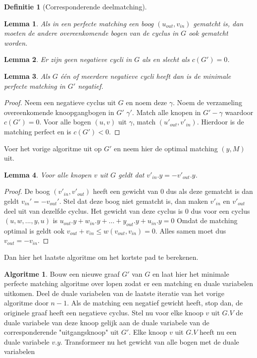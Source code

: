 \documentclass[conference]{IEEEtran}
\newtheorem{lemma}{Lemma}[section]
\theoremstyle{definition}
\newtheorem{definition}{Definitie}[section]
\newtheorem{algorithmm}{Algoritme}[section]
\begin{document}
\begin{definition}[Corresponderende deelmatching]
\end{definition}

\begin{lemma}
    Als in een perfecte matching een boog $(u_{out}, v_{in})$ gematcht is, dan moeten de andere overeenkomende bogen van de cyclus in $G$ ook gematcht worden.
\end{lemma}

\begin{lemma}
    Er zijn geen negatieve cycli in $G$ als en slecht als $c(G') = 0$.
\end{lemma}

\begin{lemma}
    Als $G$ één of meerdere negatieve cycli heeft dan is de minimale perfecte matching in $G'$ negatief.
\end{lemma}
\begin{proof}
    Neem een negatieve cyclus uit $G$ en noem deze $\gamma$. Noem de verzameling overeenkomende knoopgangbogen in $G'$ $\gamma'$. Match alle knopen in $G' - \gamma$ waardoor $c(G') = 0$. Voor alle bogen $(u, v)$ uit $\gamma$, match $(u'_{out}, v'_{in})$. Hierdoor is de matching perfect en is $c(G') < 0$.
\end{proof}

Voer het vorige algoritme uit op $G'$ en neem hier de optimal matching $(y, M)$ uit.

\begin{lemma}
    Voor alle knopen $v$ uit $G$ geldt dat $v'_{in}.y = -v'_{out}.y$.
\end{lemma}
\begin{proof}
    De boog $(v'_{in}, v'_{out})$ heeft een gewicht van $0$ dus als deze gematcht is dan geldt $v_{in}' = -v_{out}'$. Stel dat deze boog niet gematcht is, dan maken $v'_{in}$ en $v'_{out}$ deel uit van dezelfde cyclus. Het gewicht van deze cyclus is $0$ dus voor een cyclus $(u, w, ..., y, u)$ is $u_{out}.y + w_{in}.y + \dots + y_{out}.y + u_{in}.y = 0$ Omdat de matching optimal is geldt ook $v_{out} + v_{in} \leq w(v_{out}, v_{in}) = 0$. Alles samen moet dus $v_{out} = -v_{in}$.
\end{proof}

Dan hier het laatste algoritme om het kortste pad te berekenen.

\begin{algorithmm}
    Bouw een nieuwe graaf $G'$ van $G$ en laat hier het minimale perfecte matching algoritme over lopen zodat er een matching en duale variabelen uitkomen. Deel de duale variabelen van de laatste iteratie van het vorige algoritme door $n - 1$. Als de matching een negatief gewicht heeft, stop dan, de originele graaf heeft een negatieve cyclus. Stel nu voor elke knoop $v$ uit $G.V$ de duale variabele van deze knoop gelijk aan de duale variabele van de corresponderende "uitgangsknoop" uit $G'$. Elke knoop $v$ uit $G.V$ heeft nu een duale variabele $v.y$. Transformeer nu het gewicht van alle bogen met de duale variabelen 
\end{algorithmm}
\end{document}
